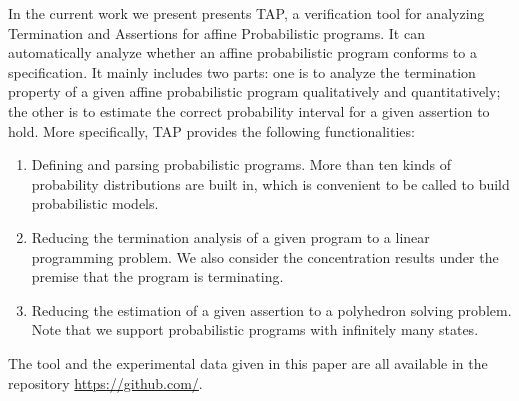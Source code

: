 \documentclass[sigconf,review, anonymous]{acmart}
\begin{document}
In the current work we present presents TAP, a verification tool for analyzing Termination and Assertions for affine Probabilistic programs. It can automatically analyze whether an affine  probabilistic program conforms to a specification.
It mainly includes two parts: one is to analyze the termination property of a given affine probabilistic program qualitatively and quantitatively; the other is to estimate the correct probability interval for a given assertion to hold.
More specifically, TAP provides the following functionalities:
\begin{enumerate}
	\item Defining and parsing probabilistic programs. More than ten kinds of probability distributions are built in, which is convenient to be called to build probabilistic models.
    \item Reducing the termination analysis of a given program to a linear programming problem. We also consider the concentration results under the premise that the program is terminating.
	\item Reducing the estimation of a given assertion to a polyhedron solving problem. Note that we support probabilistic programs with infinitely many states.	
\end{enumerate}
The tool and the experimental data given in this paper are all available in the repository \url{https://github.com/}.
\end{document}
